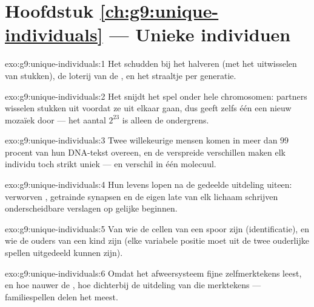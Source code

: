 \section*{Hoofdstuk \ref{ch:g9:unique-individuals} --- Unieke individuen}

\begin{solution}{exo:g9:unique-individuals:1}
Het schudden bij het halveren (met het uitwisselen van stukken),
de loterij van de , en het straaltje  per
generatie.
\end{solution}

\begin{solution}{exo:g9:unique-individuals:2}
Het snijdt het spel onder hele chromosomen: partners wisselen
stukken uit voordat ze uit elkaar gaan, dus geeft zelfs één
 een nieuw mozaïek door --- het aantal $2^{23}$ is
alleen de ondergrens.
\end{solution}

\begin{solution}{exo:g9:unique-individuals:3}
Twee willekeurige mensen komen in meer dan $99$ procent van hun
DNA-tekst overeen, en de verspreide verschillen maken elk individu
toch strikt uniek ---  en verschil in één molecuul.
\end{solution}

\begin{solution}{exo:g9:unique-individuals:4}
Hun levens lopen na de gedeelde uitdeling uiteen: verworven
, getrainde synapsen en de eigen late  van elk
lichaam schrijven onderscheidbare verslagen op gelijke beginnen.
\end{solution}

\begin{solution}{exo:g9:unique-individuals:5}
Van wie de cellen van een spoor zijn (identificatie), en wie de
ouders van een kind zijn (elke variabele positie moet uit de twee
ouderlijke spellen uitgedeeld kunnen zijn).
\end{solution}

\begin{solution}{exo:g9:unique-individuals:6}
Omdat het afweersysteem fijne zelfmerktekens leest, en hoe nauwer
de , hoe dichterbij de uitdeling van die merktekens
--- familiespellen delen het meest.
\end{solution}

